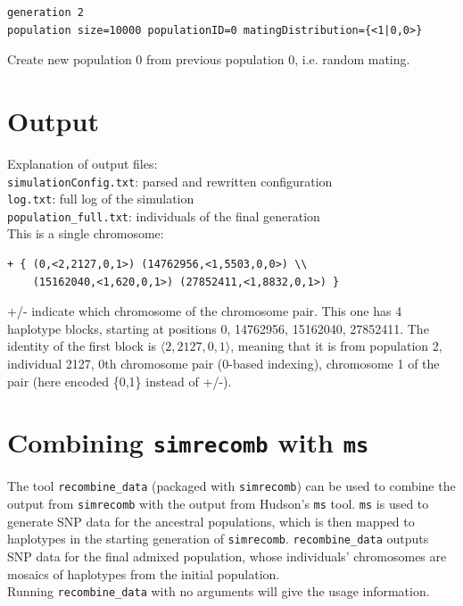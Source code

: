 \documentclass{article}
\begin{document}
\begin{verbatim}
generation 2
population size=10000 populationID=0 matingDistribution={<1|0,0>}
\end{verbatim}

\noindent Create new population 0 from previous population 0, i.e. random mating.


\section*{Output}

Explanation of output files: \\
\texttt{simulationConfig.txt}:  parsed and rewritten configuration \\
\texttt{log.txt}:  full log of the simulation \\
\texttt{population\_full.txt}:  individuals of the final generation \\

\noindent This is a single chromosome:
\begin{verbatim}
+ { (0,<2,2127,0,1>) (14762956,<1,5503,0,0>) \\
    (15162040,<1,620,0,1>) (27852411,<1,8832,0,1>) }
\end{verbatim}

\noindent +/- indicate which chromosome of the chromosome pair.  This one has 4 haplotype
blocks, starting at positions 0, 14762956, 15162040, 27852411.  The identity of
the first block is $\langle 2,2127,0,1 \rangle$, meaning that it is from
population 2, individual 2127, 0th chromosome pair (0-based indexing),
chromosome 1 of the pair (here encoded \{0,1\} instead of +/-).



\section*{Combining \texttt{simrecomb} with \texttt{ms}}

The tool \texttt{recombine\_data} (packaged with \texttt{simrecomb}) can be
used to combine the output from \texttt{simrecomb} with the output from
Hudson's \texttt{ms} tool.  \texttt{ms} is used to generate SNP data for the
ancestral populations, which is then mapped to haplotypes in the starting
generation of \texttt{simrecomb}.  \texttt{recombine\_data} outputs SNP data
for the final admixed population, whose individuals' chromosomes are mosaics of
haplotypes from the initial population. \\

\noindent Running \texttt{recombine\_data} with no arguments will give the usage information.
\end{document}
